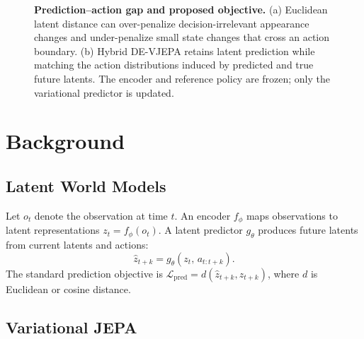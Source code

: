 \documentclass[10pt,twocolumn]{article}
\theoremstyle{tightstyle}
\begin{document}
\begin{figure}[t]
\caption{\textbf{Prediction--action gap and proposed objective.}
(a) Euclidean latent distance can over-penalize decision-irrelevant appearance
changes and under-penalize small state changes that cross an action boundary.
(b) Hybrid DE-VJEPA retains latent prediction while matching the action
distributions induced by predicted and true future latents. The encoder and
reference policy are frozen; only the variational predictor is updated.}
\label{fig:method-overview}
\end{figure}

\section{Background}
\label{sec:background}

\subsection{Latent World Models}

Let $o_t$ denote the observation at time $t$.
An encoder $f_\phi$ maps observations to latent representations $z_t = f_\phi(o_t)$.
A latent predictor $g_\theta$ produces future latents from current latents and actions:
\[
  \hat{z}_{t+k} = g_\theta(z_t,\,a_{t:t+k}).
\]
The standard prediction objective is $\mathcal{L}_{\text{pred}} = d(\hat{z}_{t+k}, z_{t+k})$,
where $d$ is Euclidean or cosine distance.

\subsection{Variational JEPA}
\label{sec:vjepa}
\end{document}
